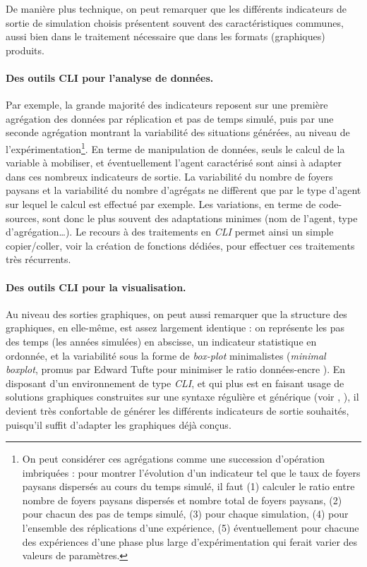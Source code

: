 De manière plus technique, on peut remarquer que les différents indicateurs de sortie de simulation choisis présentent souvent des caractéristiques communes, aussi bien dans le traitement nécessaire que dans les formats (graphiques) produits.

\paragraph{Des outils CLI pour l'analyse de données.}
Par exemple, la grande majorité des indicateurs reposent sur une première agrégation des données par réplication et pas de temps simulé, puis par une seconde agrégation montrant la variabilité des situations générées, au niveau de l'expérimentation\footnote{
	On peut considérer ces agrégations comme une succession d'opération imbriquées : pour montrer l'évolution d'un indicateur tel que le taux de foyers paysans dispersés au cours du temps simulé, il faut (1) calculer le ratio entre nombre de foyers paysans dispersés et nombre total de foyers paysans, (2) pour chacun des pas de temps simulé, (3) pour chaque simulation, (4) pour l'ensemble des réplications d'une expérience, (5) éventuellement pour chacune des expériences d'une phase plus large d'expérimentation qui ferait varier des valeurs de paramètres.
}.
En terme de manipulation de données, seuls le calcul de la variable à mobiliser, et éventuellement l'agent caractérisé sont ainsi à adapter dans ces nombreux indicateurs de sortie.
La variabilité du nombre de foyers paysans et la variabilité du nombre d'agrégats ne diffèrent que par le type d'agent sur lequel le calcul est effectué par exemple.
Les variations, en terme de code-sources, sont donc le plus souvent des adaptations minimes (nom de l'agent, type d'agrégation\ldots).
Le recours à des traitements en \textit{CLI} permet ainsi un simple copier/coller, voir la création de fonctions dédiées, pour effectuer ces traitements très récurrents.

\paragraph{Des outils CLI pour la visualisation.}
Au niveau des sorties graphiques, on peut aussi remarquer que la structure des graphiques, en elle-même, est assez largement identique : on représente les pas des temps (les années simulées) en abscisse, un indicateur statistique en ordonnée, et la variabilité sous la forme de \textit{box-plot} minimalistes (\og \textit{minimal boxplot}\fg{}, promus par Edward Tufte pour minimiser le ratio données-encre \autocite[123-125]{tufte_visual_2001}).
En disposant d'un environnement de type \textit{CLI}, et qui plus est en faisant usage de solutions graphiques construites sur une syntaxe régulière et générique (voir , ), il devient très confortable de générer les différents indicateurs de sortie souhaités, puisqu'il suffit d'adapter les graphiques déjà conçus.

